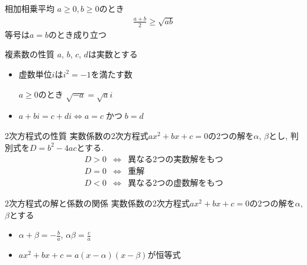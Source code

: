 \documentclass[aspectratio=169, 12pt]{beamer} %
\begin{document}
\begin{frame}{相加相乗平均}
    $a\geq0, b\geq0$のとき
    \begin{eqnarray*}
        \frac{a+b}{2}\geq \sqrt{ab}
    \end{eqnarray*}
    等号は$a=b$のとき成り立つ
\end{frame}
\begin{frame}{複素数の性質}
    $a$, $b$, $c$, $d$は実数とする
    \begin{itemize}
        \item 虚数単位$i$は$i^2=-1$を満たす数 \par
              $a\geq 0$のとき $\sqrt{-a}=\sqrt{a}i$ \par
        \item $a+bi=c+di \Leftrightarrow a=c \; かつ\; b=d$
    \end{itemize}
\end{frame}
\begin{frame}{2次方程式の性質}
    実数係数の2次方程式$ax^2+bx+c=0$の2つの解を$\alpha$, $\beta$とし, 判別式を$D=b^2-4ac$とする.
    \begin{eqnarray*}
        D>0 &\Leftrightarrow& 異なる2つの実数解をもつ \\
        D=0&\Leftrightarrow& 重解 \\
        D<0&\Leftrightarrow& 異なる2つの虚数解をもつ
    \end{eqnarray*}
\end{frame}
\begin{frame}{2次方程式の解と係数の関係}
    実数係数の2次方程式$ax^2+bx+c=0$の2つの解を$\alpha$, $\beta$とする
    \begin{itemize}
        \item $\alpha+\beta=-\frac{b}{a}$, $\alpha\beta=\frac{c}{a}$
        \item $ax^2+bx+c=a(x-\alpha)(x-\beta)$が恒等式
    \end{itemize}
\end{frame}
\end{document}
